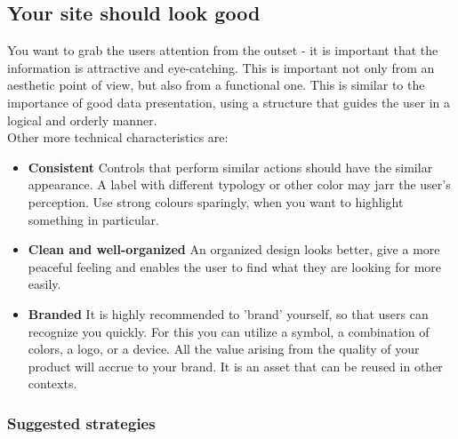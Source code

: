 \subsection{Your site should look good}

You want to grab the users attention from the outset - it is important that the information is attractive and eye-catching.
This is important not only from an aesthetic point of view, but also from a functional one.
This is similar to the importance of good data presentation, using a structure that guides the user in a logical and orderly manner.\\

Other more technical characteristics are:
\begin{itemize}
    \item\textbf{Consistent} Controls that perform similar actions should have the similar appearance.
    A label with different typology or other color may jarr the user's perception. Use strong colours sparingly, when
    you want to highlight something in particular. \\

    \item\textbf{Clean and well-organized} An organized design looks better, give a more peaceful feeling and enables the user to find what they are looking for more easily. \\ 

    \item\textbf{Branded} It is highly recommended to 'brand' yourself, so that users can recognize you quickly. For this you can utilize a symbol, a combination of colors, a logo, or a device.
    All the value arising from the quality of your product will accrue to your brand. It is an asset that can be reused in other contexts. \\
\end{itemize}


\subsubsection*{Suggested strategies}

